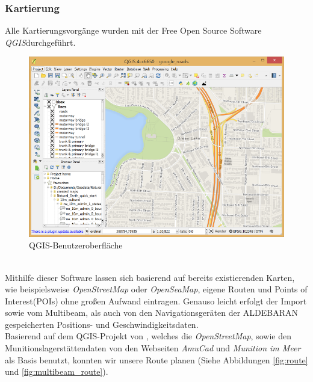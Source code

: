 \subsubsection{Kartierung}
\label{kartierung}
Alle Kartierungsvorgänge wurden mit der Free Open Source Software\\
\emph{QGIS}\cite{qgis}durchgeführt.
\begin{figure}[ht]
    \centering
    \includegraphics[width=.4\linewidth]{Bilder/QGIS/about-screenshot.png}
    \caption[fig:qgisabout]{QGIS-Benutzeroberfläche}
\end{figure}
\\Mithilfe dieser Software lassen sich basierend auf bereits existierenden Karten, 
wie beispielsweise \emph{OpenStreetMap}\cite{ostrm} oder \emph{OpenSeaMap}\cite{oseam},
eigene Routen und Points of \\Interest(POIs) ohne großen Aufwand eintragen. Genauso 
leicht erfolgt der Import sowie vom Multibeam,  als auch von den Navigationsgeräten 
der ALDEBARAN gespeicherten Positions- und Geschwindigkeitsdaten.\\


Basierend auf dem QGIS-Projekt von \jens, welches die \emph{OpenStreetMap}, sowie den Munitionslagerstättendaten von den Webseiten
\emph{AmuCad}\cite{amucad} und \emph{Munition im Meer}\cite{muninmeer}
als Basis benutzt, konnten wir unsere Route planen (Siehe Abbildungen \ref{fig:route} und \ref{fig:multibeam_route}).

